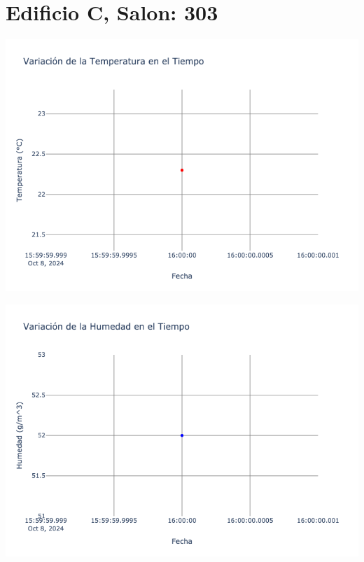 \documentclass{article}
\begin{document}
    \section{Edificio C, Salon: 303}
    \noindent
    \begin{minipage}{0.48\textwidth}
        \centering
        \includegraphics[width=\textwidth]{../img/poli/TS303-90Dias-03-12-2024.png}
    \end{minipage}
    \hfill
    \begin{minipage}{0.48\textwidth}
        \centering
        \includegraphics[width=\textwidth]{../img/poli/HS303-90Dias-03-12-2024.png}
    \end{minipage}
\end{document}
